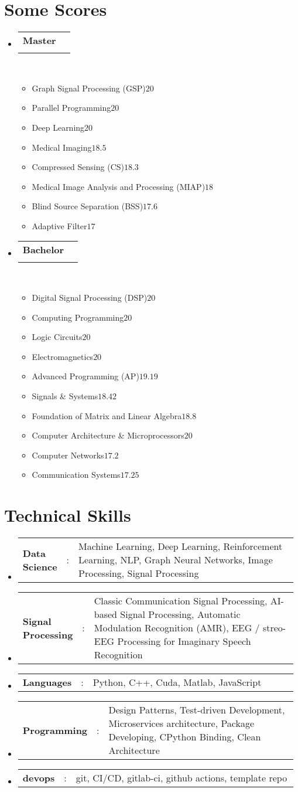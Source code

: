 \documentclass[a4paper,11pt]{article}
\makeatletter
\newcommand{\resumeItemScore}[2]{\item[]\small#1\hfill#2}
\newcommand{\resumeItemListStart}{\begin{itemize}[rightmargin=0.11in]}
\newcommand{\resumeItemListEnd}{\end{itemize}}
\newcommand{\resumeSectionType}[3]{
\item\begin{tabular*}{0.96\textwidth}[t]{
p{0.15\linewidth}p{0.02\linewidth}p{0.81\linewidth}
}
\textbf{#1} & #2 & #3
\end{tabular*}\vspace{-2pt}
}
\newcommand{\resumeQuadHeading}[4]{
\item
\begin{tabular*}{0.96\textwidth}[t]{l@{\extracolsep{\fill}}r}
\textbf{#1} & #2 \\
\textit{\small#3} & \textit{\small #4} \\
\end{tabular*}
}
\newcommand{\resumeHeadingListStart}{
\begin{itemize}[leftmargin=0.15in, label={}]
}
\newcommand{\resumeHeadingListEnd}{\end{itemize}}
\makeatother
\begin{document}
\section{Some Scores}
%
\resumeHeadingListStart{}
\resumeQuadHeading{Master}{}{}{}\\\vspace{-1.5em}

\begin{multicols}{2}
\resumeItemListStart{}
\resumeItemScore{Graph Signal Processing (GSP)}{$20$}
\resumeItemScore{Parallel Programming}{$20$}
\resumeItemScore{Deep Learning}{$20$}
\resumeItemScore{Medical Imaging}{$18.5$}
\resumeItemScore{Compressed Sensing (CS)}{$18.3$}
\resumeItemScore{Medical Image Analysis and Processing (MIAP)}{$18$}
\resumeItemScore{Blind Source Separation (BSS)}{$17.6$}
\resumeItemScore{Adaptive Filter}{$17$}
\resumeItemListEnd{}
\end{multicols}


\resumeQuadHeading{Bachelor}{}{}{}\\\vspace{-1.5em}
\begin{multicols}{2}
\resumeItemListStart{}
\resumeItemScore{Digital Signal Processing (DSP)}{$20$}
\resumeItemScore{Computing Programming}{$20$}
\resumeItemScore{Logic Circuits}{$20$}
\resumeItemScore{Electromagnetics}{$20$}
\resumeItemScore{Advanced Programming (AP)}{$19.19$}
\resumeItemScore{Signals \& Systems}{$18.42$}
\resumeItemScore{Foundation of Matrix and Linear Algebra}{$18.8$}
\resumeItemScore{Computer Architecture \& Microprocessors}{$20$}
\resumeItemScore{Computer Networks}{$17.2$}
\resumeItemScore{Communication Systems}{$17.25$}
\resumeItemListEnd{}
\end{multicols}

\resumeHeadingListEnd{}


%



\section{Technical Skills}
\resumeHeadingListStart{}
\resumeSectionType{Data Science}{:}{Machine Learning, Deep Learning, Reinforcement Learning, NLP, Graph Neural Networks, Image Processing, Signal Processing}
\resumeSectionType{Signal Processing}{:}{Classic Communication Signal Processing, AI-based Signal Processing, Automatic Modulation Recognition (AMR), EEG / streo-EEG Processing for Imaginary Speech Recognition}
\resumeSectionType{Languages}{:}{Python, C++, Cuda, Matlab, JavaScript}
\resumeSectionType{Programming}{:}{Design Patterns, Test-driven Development, Microservices architecture, Package Developing, CPython Binding, Clean Architecture}
\resumeSectionType{devops}{:}{git, CI/CD, gitlab-ci, github actions, template repo}
\resumeHeadingListEnd{}
\end{document}
